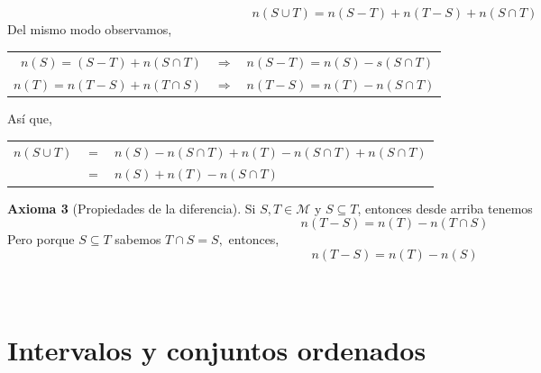 \begin{enumerate}
	$$n(S\cup T)=n(S-T) + n(T-S) + n(S \cap T)$$
	Del mismo modo observamos,
	\begin{center}
	    \begin{tabular}{r c l}
		$n(S) = (S-T) + n(S\cap T)$ & $\Rightarrow$ & $n(S-T) = n(S) -s(S\cap T)$\\
		$n(T) = n(T-S) + n(T\cap S)$ & $\Rightarrow$ & $n(T-S)=n(T) - n(S\cap T)$\\
	    \end{tabular}
	\end{center}
	Así que, 
	\begin{center}
	    \begin{tabular}{rcl}
		$n(S\cup T)$ & $=$ & $n(S) -n(S\cap T) + n(T) -n(S\cap T) +n(S\cap T)$\\
		 & $=$ & $n(S) +n(T) -n(S\cap T)$\\
	    \end{tabular}
	\end{center}
	\textbf{Axioma 3} (Propiedades de la diferencia). Si $S,T \in \mathcal{M}$ y $S\subseteq T$, entonces desde arriba tenemos $$n(T-S)=n(T) -n(T\cap S)$$
	Pero porque $S\subseteq T$ sabemos $T\cap S = S,$ entonces,
	$$n(T-S)=n(T)-n(S)$$\\\\

    \end{enumerate}

\section{Intervalos y conjuntos ordenados}

